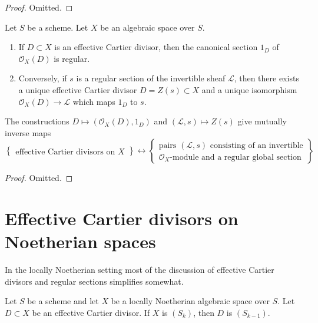 \begin{proof}
Omitted.
\end{proof}

\begin{lemma}
\label{lemma-characterize-OD}
Let $S$ be a scheme. Let $X$ be an algebraic space over $S$.
\begin{enumerate}
\item If $D \subset X$ is an effective Cartier divisor, then
the canonical section $1_D$ of $\mathcal{O}_X(D)$ is regular.
\item Conversely, if $s$ is a regular section of the invertible
sheaf $\mathcal{L}$, then there exists a unique effective
Cartier divisor $D = Z(s) \subset X$ and a unique isomorphism
$\mathcal{O}_X(D) \to \mathcal{L}$ which maps $1_D$ to $s$.
\end{enumerate}
The constructions
$D \mapsto (\mathcal{O}_X(D), 1_D)$ and $(\mathcal{L}, s) \mapsto Z(s)$
give mutually inverse maps
$$
\left\{
\begin{matrix}
\text{effective Cartier divisors on }X
\end{matrix}
\right\}
\leftrightarrow
\left\{
\begin{matrix}
\text{pairs }(\mathcal{L}, s)\text{ consisting of an invertible}\\
\mathcal{O}_X\text{-module and a regular global section}
\end{matrix}
\right\}
$$
\end{lemma}

\begin{proof}
Omitted.
\end{proof}





\section{Effective Cartier divisors on Noetherian spaces}
\label{section-Noetherian-effective-Cartier}

\noindent
In the locally Noetherian setting most of the discussion of
effective Cartier divisors and regular sections simplifies somewhat.

\begin{lemma}
\label{lemma-effective-Cartier-divisor-Sk}
Let $S$ be a scheme and let $X$ be a locally Noetherian algebraic space
over $S$. Let $D \subset X$ be an effective Cartier divisor. If $X$ is
$(S_k)$, then $D$ is $(S_{k - 1})$.
\end{lemma}

